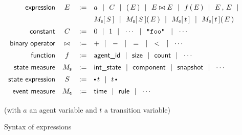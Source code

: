 \newcommand{\GEvMeasure}{M_{\textsf{e}}}
\newcommand{\GStMeasure}{M_{\textsf{s}}}


\begin{figure}[p]
  \vspace{0.5cm}
  \hrulefill
  \centering  
  \begin{equation*}\label{expr-syntax}
  \arraycolsep=5pt
  \def\arraystretch{1.4}
  \begin{array}{rccl}
    \m{expression} & E & := &
        a \OR C \OR (\,E\,) \OR E \bowtie E \OR f\,(\,E\,) \OR E\,,\, E \OR \\
     & &  &  
        \GStMeasure[\,S\,] \OR \GStMeasure[\,S\,](\,E\,) \OR
        \GEvMeasure[\,t\,] \OR \GEvMeasure[\,t\,](\,E\,)  \\
    \m{constant} & C & := & 0 \OR 1 \OR \cdots 
          \OR \STR{foo} \,\OR \cdots \\
    \m{binary operator} & \bowtie & := & + \OR - \OR = \OR < \OR \cdots \\
     \m{function} & f & := & 
        \m{agent\_id} \OR \textsf{size} \OR \textsf{count} \OR \cdots \\
    \m{state measure} & \GStMeasure & := & \m{int\_state} \OR
         \m{component} \OR \m{snapshot} \OR \cdots \\
    \m{state expression} & S & := & \StateBefore{t} \OR \StateAfter{t} \\
    \m{event measure} & \GEvMeasure & := & \m{time} \OR
         \m{rule} \OR \cdots \\
  \end{array}
  \end{equation*}

  {(with $a$ an agent variable and $t$ a transition variable)}

  \medskip
  \hrulefill
  \smallskip

  \caption{Syntax of expressions}
  \label{fig:expressions}
\end{figure}